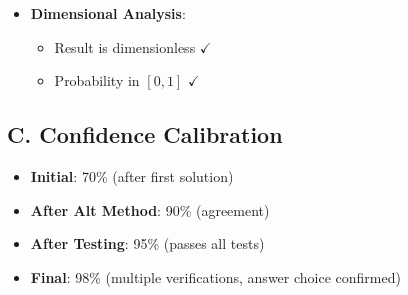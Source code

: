 \documentclass[11pt]{article}
\begin{document}
\begin{verificationbox}
\begin{itemize}[leftmargin=*]
    \item \textbf{Dimensional Analysis}:
    \begin{itemize}
        \item Result is dimensionless $\checkmark$
        \item Probability in $[0,1]$ $\checkmark$
    \end{itemize}
\end{itemize}

\subsection*{C. Confidence Calibration}
\begin{itemize}[leftmargin=*]
    \item \textbf{Initial}: 70\% (after first solution)
    \item \textbf{After Alt Method}: 90\% (agreement)
    \item \textbf{After Testing}: 95\% (passes all tests)
    \item \textbf{Final}: 98\% (multiple verifications, answer choice confirmed)
\end{itemize}
\end{verificationbox}
\end{document}
